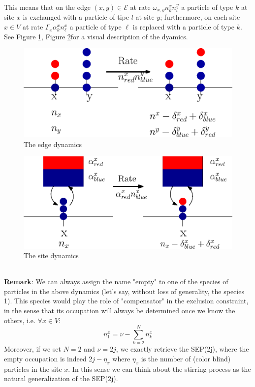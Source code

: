\documentclass[11pt]{article}
\numberwithin{equation}{section}
\numberwithin{equation}{subsection}
\newcommand{\twoj}{\nu}
\begin{document}
This means that on the edge $(x,y)\in \mathcal{E}$ at rate $\omega_{x,y}n_{k}^{x}n_{l}^{y}$ a particle of type $k$ at site $x$ is exchanged with a particle of tipe $l$ at site $y$; furthermore, on each site $x\in V$ at rate $\Gamma_{x}\alpha_{k}^{x}n_{\ell}^{x}$ a particle of type $\ell$ is replaced with a particle of type $k$. 
See Figure \ref{fig:1}, Figure \ref{fig:2}for a visual description of the dyamics. 
\begin{figure}
    \centering
    \includegraphics[scale=0.6]{Dyn_stir.eps}
    \caption{The edge dynamics}
    \label{fig:1}
\end{figure}
\begin{figure}
    \centering
    \includegraphics[scale=0.88]{Dyn_stir_bordo.eps}
    \caption{The site dynamics}
    \label{fig:2}
\end{figure}\newline \\
{\color{blue}\textbf{Remark}: 
    We can always assign the name "empty" to one of the species of particles in the above dynamics (let's say, without loss of generality, the species 1). This species would play the role of "compensator" in the exclusion constraint, in the sense that its occupation will always be determined once we know the others, i.e. $\forall x\in V$: 
    \begin{equation}
        n_{1}^{x}=\twoj-\sum_{k=2}^{N}n_{k}^{x}
    \end{equation}
    Moreover, if we set $N=2$ and $\twoj=2j$, we exactly retrieve the SEP(2j), where the empty occupation is indeed $2j-\eta_{x}$ where $\eta_{x}$ is the number of (color blind) particles in the site $x$. In this sense we can think about the stirring process as the natural generalization of the SEP(2j).}
\end{document}
